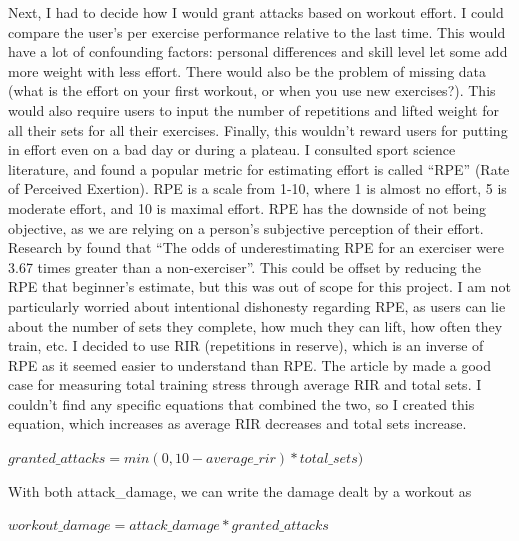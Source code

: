 \documentclass{l4proj}
\begin{document}
Next, I had to decide how I would grant attacks based on workout effort. I could compare the user's per exercise performance relative to the last time. This would have a lot of confounding factors: personal differences and skill level let some add more weight with less effort. There would also be the problem of missing data (what is the effort on your first workout, or when you use new exercises?). This would also require users to input the number of repetitions and lifted weight for all their sets for all their exercises. Finally, this wouldn't reward users for putting in effort even on a bad day or during a plateau. I consulted sport science literature, and found a popular metric for estimating effort is called ``RPE'' (Rate of Perceived Exertion). RPE is a scale from 1-10, where 1 is almost no effort, 5 is moderate effort, and 10 is maximal effort. RPE has the downside of not being objective, as we are relying on a person's subjective perception of their effort. Research by \citet{RPE_estimations} found that ``The odds of underestimating RPE for an exerciser were 3.67 times greater than a non-exerciser''. This could be offset by reducing the RPE that beginner's estimate, but this was out of scope for this project. I am not particularly worried about intentional dishonesty regarding RPE, as users can lie about the number of sets they complete, how much they can lift, how often they train, etc. I decided to use RIR (repetitions in reserve), which is an inverse of RPE as it seemed easier to understand than RPE. The article by \citet{rir} made a good case for measuring total training stress through average RIR and total sets. I couldn't find any specific equations that combined the two, so I created this equation, which increases as average RIR decreases and total sets increase.

\begin{algorithm}
  $granted\_attacks = min(0, 10 - average\_rir) * total\_sets)$
\end{algorithm}

With both attack\_damage, we can write the damage dealt by a workout as 

\begin{algorithm}
  $workout\_damage = attack\_damage * granted\_attacks$ 
\end{algorithm}
\end{document}
